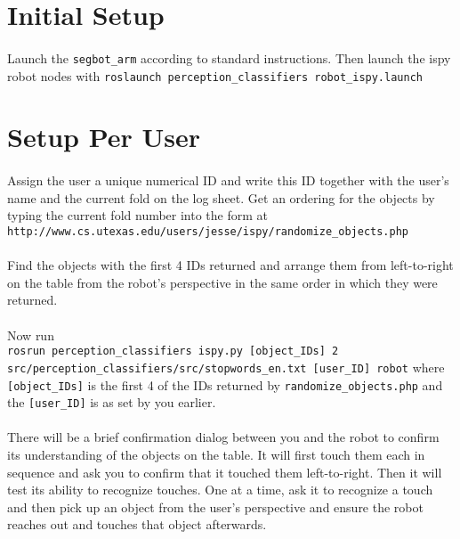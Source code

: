 \documentclass{article}
\begin{document}
\section{Initial Setup}

\paragraph{} Launch the \texttt{segbot\_arm} according to standard instructions. Then launch the ispy robot nodes with \texttt{roslaunch perception\_classifiers robot\_ispy.launch}

\section{Setup Per User}

\paragraph{} Assign the user a unique numerical ID and write this ID together with the user's name and the current fold on the log sheet. Get an ordering for the objects by typing the current fold number into the form at \texttt{http://www.cs.utexas.edu/users/jesse/ispy/randomize\_objects.php} 

\paragraph{} Find the objects with the first 4 IDs returned and arrange them from left-to-right on the table from the robot's perspective in the same order in which they were returned.

\paragraph{} Now run\\ \texttt{rosrun perception\_classifiers ispy.py [object\_IDs] 2 src/perception\_classifiers/src/stopwords\_en.txt [user\_ID] robot}
where \texttt{[object\_IDs]} is the first 4 of the IDs returned by \texttt{randomize\_objects.php} and the \texttt{[user\_ID]} is as set by you earlier.

\paragraph{} There will be a brief confirmation dialog between you and the robot to confirm its understanding of the objects on the table. It will first touch them each in sequence and ask you to confirm that it touched them left-to-right. Then it will test its ability to recognize touches. One at a time, ask it to recognize a touch and then pick up an object from the user's perspective and ensure the robot reaches out and touches that object afterwards.
\end{document}

